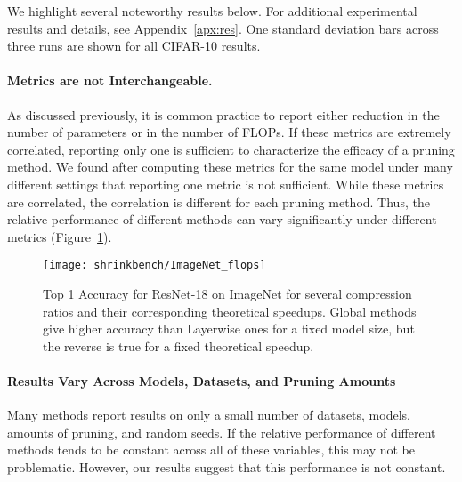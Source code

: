 We highlight several noteworthy results below. For additional experimental results and details, see Appendix~\ref{apx:res}.  One standard deviation bars across three runs are shown for all CIFAR-10 results.

\vspace{-2mm}
\paragraph{Metrics are not Interchangeable.}
As discussed previously, it is common practice to report either reduction in the number of parameters or in the number of FLOPs. If these metrics are extremely correlated, reporting only one is sufficient to characterize the efficacy of a pruning method. We found after computing these metrics for the same model under many different settings that reporting one metric is not sufficient. While these metrics are correlated, the correlation is different for each pruning method. Thus, the relative performance of different methods can vary significantly under different metrics (Figure~\ref{fig:ImageNet_flops}).
\begin{figure}[h]
\begin{center}
\texttt{[image: shrinkbench/ImageNet\_flops]}
\caption{Top 1 Accuracy for ResNet-18 on ImageNet for several compression ratios and their corresponding theoretical speedups.
%
Global methods give higher accuracy than Layerwise ones for a fixed model size, but the reverse is true for a fixed theoretical speedup.
}
\label{fig:ImageNet_flops}
\end{center}
\vspace*{-3mm}
\end{figure}

\vspace{-3mm}
\paragraph{Results Vary Across Models, Datasets, and Pruning Amounts}

Many methods report results on only a small number of datasets, models, amounts of pruning, and random seeds. If the relative performance of different methods tends to be constant across all of these variables, this may not be problematic. However, our results suggest that this performance is not constant.

